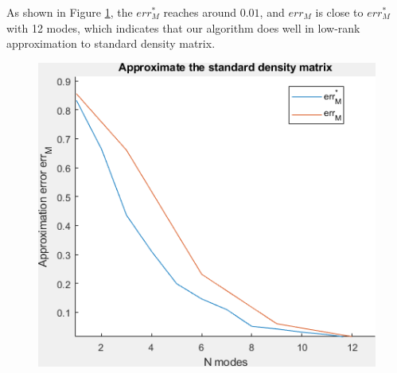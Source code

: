 \documentclass{article}
\numberwithin{equation}{section}
\begin{document}
 As shown in Figure \ref{fig:approx error}, the $err_M^*$ reaches around $0.01$, and $err_M$ is close to $err_M^*$ with 12 modes, which indicates that our algorithm does well in low-rank approximation to standard density matrix.

\begin{figure}[H]
\centering
\includegraphics[width=0.8\linewidth]{../figures/approximation.png}
\caption{}

   \label{fig:approx error}

 \end{figure}
\end{document}
